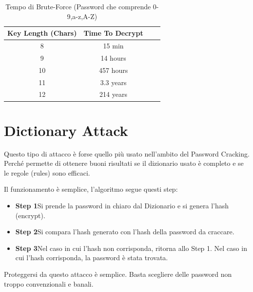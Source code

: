 \begin{table}[h]
    \centering
    \begin{tabular}{ |c|c|c|c| }
        \hline
        Key Length (Chars) & Time To Decrypt \\
        \hline
        8                  & 15 min          \\
        \hline
        9                  & 14 hours        \\
        \hline
        10                 & 457 hours       \\
        \hline
        11                 & 3.3 years       \\
        \hline
        12                 & 214 years       \\
        \hline
    \end{tabular}
    \label{fig:brute}
    \caption{Tempo di Brute-Force (Password che comprende 0-9,a-z,A-Z)\cite{hashcrack}}
\end{table}

\newpage

\section{Dictionary Attack}
Questo tipo di attacco \cite{Dictionary_attack} è forse quello più usato nell’ambito del Password Cracking. Perché permette di ottenere buoni risultati se il dizionario usato è completo e se le regole (rules) sono efficaci.

Il funzionamento è semplice, l’algoritmo segue questi step:
\begin{itemize}
    \item \textbf{Step 1}\newline Si prende la password in chiaro dal Dizionario e si genera l’hash (encrypt).
    \item \textbf{Step 2}\newline Si compara l’hash generato con l’hash della password da craccare.
    \item \textbf{Step 3}\newline Nel caso in cui l’hash non corrisponda, ritorna allo Step 1. \newline Nel caso in cui l’hash corrisponda, la password è stata trovata.
\end{itemize}

Proteggersi da questo attacco è semplice. Basta scegliere delle password non troppo convenzionali e banali.

